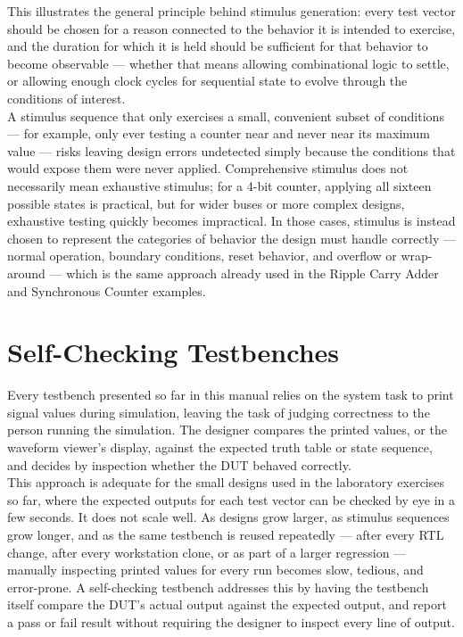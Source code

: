 \noindent This illustrates the general principle behind stimulus generation: every test vector should be chosen for a reason connected to the behavior it is intended to exercise, and the duration for which it is held should be sufficient for that behavior to become observable — whether that means allowing combinational logic to settle, or allowing enough clock cycles for sequential state to evolve through the conditions of interest.\\


A stimulus sequence that only exercises a small, convenient subset of conditions — for example, only ever testing a counter near  and never near its maximum value — risks leaving design errors undetected simply because the conditions that would expose them were never applied. Comprehensive stimulus does not necessarily mean exhaustive stimulus; for a 4-bit counter, applying all sixteen possible states is practical, but for wider buses or more complex designs, exhaustive testing quickly becomes impractical. In those cases, stimulus is instead chosen to represent the categories of behavior the design must handle correctly — normal operation, boundary conditions, reset behavior, and overflow or wrap-around — which is the same approach already used in the Ripple Carry Adder and Synchronous Counter examples.


\section{Self-Checking Testbenches}
Every testbench presented so far in this manual relies on the  system task to print signal values during simulation, leaving the task of judging correctness to the person running the simulation. The designer compares the printed values, or the waveform viewer's display, against the expected truth table or state sequence, and decides by inspection whether the DUT behaved correctly.\\


\noindent This approach is adequate for the small designs used in the laboratory exercises so far, where the expected outputs for each test vector can be checked by eye in a few seconds. It does not scale well. As designs grow larger, as stimulus sequences grow longer, and as the same testbench is reused repeatedly — after every RTL change, after every workstation clone, or as part of a larger regression — manually inspecting printed values for every run becomes slow, tedious, and error-prone. A self-checking testbench addresses this by having the testbench itself compare the DUT's actual output against the expected output, and report a pass or fail result without requiring the designer to inspect every line of output.\\

